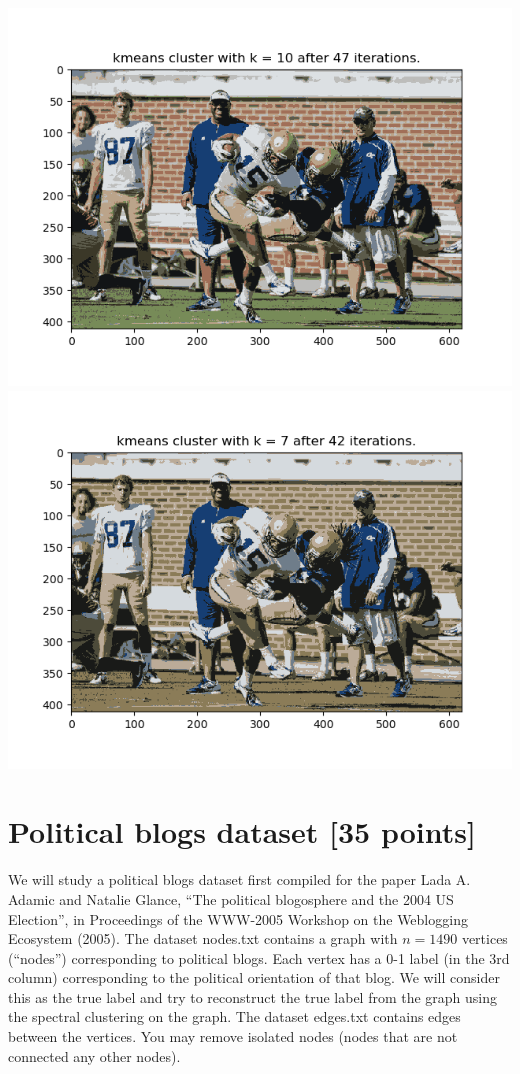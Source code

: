 \documentclass[twoside,10pt]{article}
\begin{document}
\begin{enumerate}
    \begin{center}\includegraphics[scale=0.5]{kmeans1.png}\includegraphics[scale=0.5]{homework1/kmeans2.png}\end{center}
\end{enumerate}


\section{Political blogs dataset [35 points] }

We will study a political blogs dataset first compiled for the paper Lada A. Adamic and Natalie Glance, ``The political blogosphere and the 2004 US Election'', in Proceedings of the WWW-2005 Workshop on the Weblogging Ecosystem (2005). The dataset \textsf{nodes.txt} contains a graph with $n = 1490$ vertices (``nodes'') corresponding to political blogs. Each vertex has a 0-1 label (in the 3rd column) corresponding to the political orientation of that blog. We will consider this as the true label and try to reconstruct the true label from the graph using the spectral clustering on the graph. The dataset \textsf{edges.txt} contains edges between the vertices. You may remove isolated nodes (nodes that are not connected any other nodes). 
\end{document}
